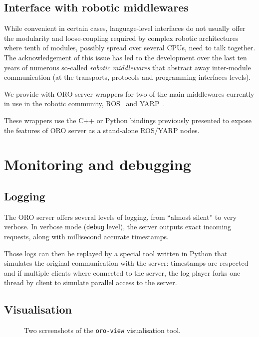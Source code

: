 \subsection{Interface with robotic middlewares}
\label{sect|interfacing-middlewares}

While convenient in certain cases, language-level interfaces do not usually
offer the modularity and loose-coupling required by complex robotic
architectures where tenth of modules, possibly spread over several CPUs, need
to talk together. The acknowledgement of this issue has led to the development
over the last ten years of numerous so-called \emph{robotic middlewares} that
abstract away inter-module communication (at the transports, protocols and
programming interfaces levels).

We provide with ORO server wrappers for two of the main middlewares currently
in use in the robotic community, ROS~\cite{Quigley2009} and
YARP~\cite{Metta2006}.

These wrappers use the C++ or Python bindings previously presented to expose
the features of ORO server as a stand-alone ROS/YARP nodes.

\section{Monitoring and debugging}
\label{sect|monitoring}

\subsection{Logging}

The ORO server offers several levels of logging, from ``almost silent'' to very
verbose. In verbose mode ({\tt debug} level), the server outputs exact incoming
requests, along with millisecond accurate timestamps.

Those logs can then be replayed by a special tool written in Python that
simulates the original communication with the server: timestamps are respected
and if multiple clients where connected to the server, the log player forks one
thread by client to simulate parallel access to the server.

\subsection{Visualisation}

\begin{figure}
    \centering
    \caption{Two screenshots of the {\tt oro-view} visualisation tool.}
    \label{fig|oroview}
\end{figure}

